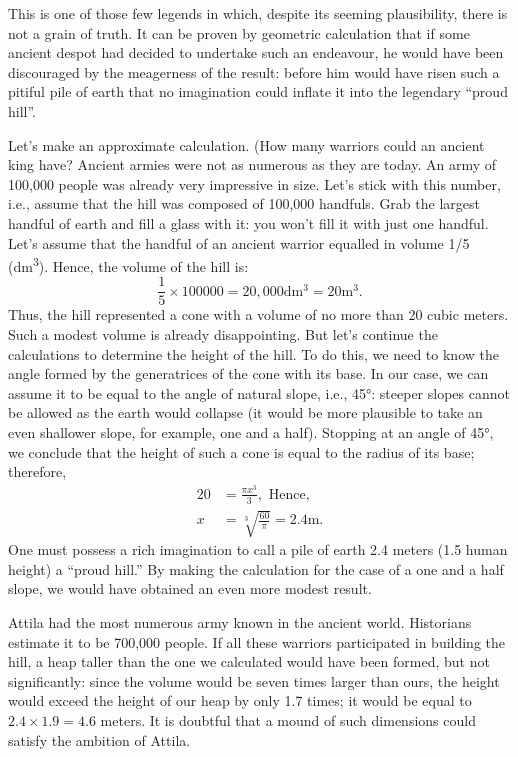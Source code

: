 This is one of those few legends in which, despite its seeming plausibility, there is not a grain of truth. It can be proven by geometric calculation that if some ancient despot had decided to undertake such an endeavour, he would have been discouraged by the meagerness of the result: before him would have risen such a pitiful pile of earth that no imagination could inflate it into the legendary ``proud hill''.

Let's make an approximate calculation. (How many warriors could an ancient king have? Ancient armies were not as numerous as they are today. An army of 100,000 people was already very impressive in size. Let's stick with this number, i.e., assume that the hill was composed of 100,000 handfuls. Grab the largest handful of earth and fill a glass with it: you won't fill it with just one handful. Let's assume that the handful of an ancient warrior equalled in volume 1/5 (\si{\deca\meter\cubed}). Hence, the volume of the hill is:
\begin{equation*}%
\frac{1}{5} \times 100000 = 20,000 \si{\deca\meter\cubed} = 20 \si{\meter\cubed}.
\end{equation*}
Thus, the hill represented a cone with a volume of no more than 20 cubic meters. Such a modest volume is already disappointing. But let's continue the calculations to determine the height of the hill. To do this, we need to know the angle formed by the generatrices of the cone with its base. In our case, we can assume it to be equal to the angle of natural slope, i.e., \ang{45}: steeper slopes cannot be allowed as the earth would collapse (it would be more plausible to take an even shallower slope, for example, one and a half). Stopping at an angle of \ang{45}, we conclude that the height of such a cone is equal to the radius of its base; therefore,
\begin{align*}%
20 & = \frac{\pi x^{3}}{3}, \,\, \text{Hence,}\\
x & = \sqrt[3]{\frac{60}{\pi}} =  2.4 \si{\meter}.
\end{align*}
One must possess a rich imagination to call a pile of earth 2.4 meters (1.5 human height) a ``proud hill.'' By making the calculation for the case of a one and a half slope, we would have obtained an even more modest result.

Attila had the most numerous army known in the ancient world. Historians estimate it to be 700,000 people. If all these warriors participated in building the hill, a heap taller than the one we calculated would have been formed, but not significantly: since the volume would be seven times larger than ours, the height would exceed the height of our heap by only 1.7 times; it would be equal to $2.4 \times 1.9 = 4.6$ meters. It is doubtful that a mound of such dimensions could satisfy the ambition of Attila.

